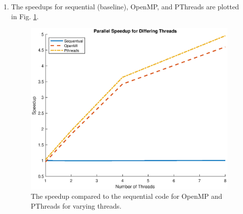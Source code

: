 \documentclass[a4paper,12pt]{article}
\theoremstyle{definition}
\theoremstyle{remark}
\begin{document}
\begin{enumerate}
\begin{table}[h]
				\label{tab:speedOMP}
			\end{table}
			\item The speedups for sequential (baseline), OpenMP, and PThreads are plotted in Fig. \ref{fig:speedup}.
			\begin{figure}[h]
				\centering
				\includegraphics[width=0.7\linewidth]{speedup}
				\caption{The speedup compared to the sequential code for OpenMP and PThreads for varying threads.}
				\label{fig:speedup}
			\end{figure}
			
		\end{enumerate}
		
\end{document}
